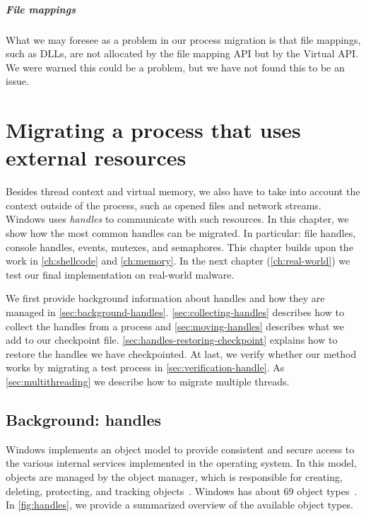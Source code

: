 \documentclass[a4paper, 11pt, english]{report}
\begin{document}
\paragraph{File mappings} What we may foresee as a problem in our process migration is that file mappings, such as DLLs, are not allocated by the file mapping API but by the Virtual API. We were warned this could be a problem, but we have not found this to be an issue.

\chapter{Migrating a process that uses external resources}
\label{ch:handles}
Besides thread context and virtual memory, we also have to take into account the context outside of the process, such as opened files and network streams. Windows uses \textit{handles} to communicate with such resources. In this chapter, we show how the most common handles can be migrated. In particular: file handles, console handles, events, mutexes, and semaphores. This chapter builds upon the work in \autoref{ch:shellcode} and \autoref{ch:memory}. In the next chapter (\autoref{ch:real-world}) we test our final implementation on real-world malware.

We first provide background information about handles and how they are managed in \autoref{sec:background-handles}. \autoref{sec:collecting-handles} describes how to collect the handles from a process and \autoref{sec:moving-handles} describes what we add to our checkpoint file. \autoref{sec:handles-restoring-checkpoint} explains how to restore the handles we have checkpointed. At last, we verify whether our method works by migrating a test process in \autoref{sec:verification-handle}. As \autoref{sec:multithreading} we describe how to migrate multiple threads. 

\section{Background: handles}
\label{sec:background-handles}
Windows implements an object model to provide consistent and secure access to the various internal services implemented in the operating system. In this model, objects are managed by the object manager, which is responsible for creating, deleting, protecting, and tracking objects~\cite[p.125]{windows-internals-2}.
Windows has about 69 object types~\cite[p.128]{windows-internals-2}. %
In \autoref{fig:handles}, we provide a summarized overview of the available object types.
\end{document}
